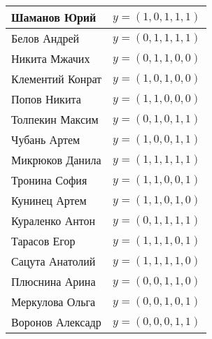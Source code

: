 \documentclass[12pt,a4paper]{scrartcl}
\begin{document}
{\begin{center}
\def\arraystretch{1.5}
\setlength{\tabcolsep}{15pt}
\begin{tabular}{l  | c }
	Шаманов Юрий    & $y = (1, 0, 1, 1, 1)$\\ \hline
	Белов Андрей  &  $y =  (0, 1, 1, 1, 1)$\\  \hline
	Никита Мжачих&  $y=(0, 1, 1, 0, 0)$\\  \hline
	Клементий Конрат  & $y = (1, 0, 1, 0, 0)$\\  \hline
	Попов Никита & $y=(1, 1, 0, 0, 0)$ \\  \hline
	Толпекин Максим &  $y=(0, 1, 0, 1, 1)$\\  \hline
	Чубань Артем & $y = (1, 0, 0, 1, 1)$ \\  \hline
	Микрюков Данила  & $y=(1, 1, 1, 1, 1)$\\  \hline
	Тронина София  & $y=(1, 1, 0, 0, 1)$\\  \hline
	Кунинец Артем  & $y=(1, 1, 0, 1, 0)$\\  \hline
	Кураленко Антон  & $y=(0, 1, 1, 1, 1)$\\  \hline
	Тарасов Егор & $y=(1, 1, 1, 0, 1)$\\  \hline
	Сацута Анатолий  & $y=(1, 1, 1, 1, 0)$\\  \hline
	Плюснина Арина  & $y=(0, 0, 1, 1, 0)$\\  \hline
	Меркулова Ольга  & $y=(0, 0, 1, 0, 1)$\\  \hline
	Воронов Алексадр  & $y=(0, 0, 0, 1, 1)$\\  \hline
\end{tabular}
\end{center}
	
}

\newpage\ \newpage
 
\end{document}
